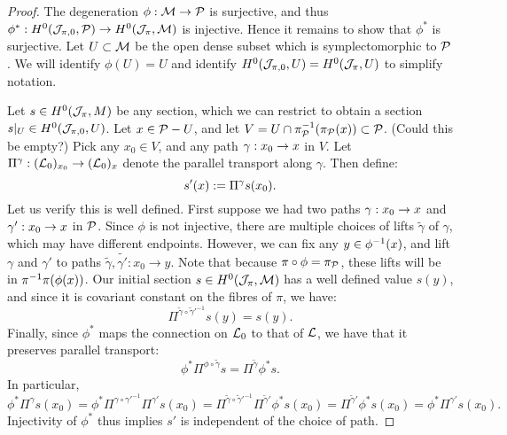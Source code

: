 	\begin{proof}
		The degeneration $\phi:\mathcal{M}\to\mathcal{P}$ is surjective, and thus $\phi^\ast:H^0(\mathcal{J}_{\pi,0},\mathcal{P}) \to H^0(\mathcal{J}_\pi,\mathcal{M})$ is injective. Hence it remains to show that $\phi^\ast$ is surjective. Let $U \subset \mathcal{M}$ be the open dense subset which is symplectomorphic to $\mathcal{P}$. We will identify $\phi(U)=U$ and identify $H^0(\mathcal{J}_{\pi,0}, U) = H^0(\mathcal{J}_\pi, U)$ to simplify notation.
		\smallskip
		
		Let $s\in H^0(\mathcal{J}_\pi, M)$ be any section, which we can restrict to obtain a section $s|_U\in H^0(\mathcal{J}_{\pi,0}, U)$. Let $x \in \mathcal{P} - U$, and let $V = U\cap \pi_{\mathcal{P}}^{-1}(\pi_{\mathcal{P}}(x)) \subset \mathcal{P}$. (Could this be empty?) Pick any $x_0\in V$, and any path $\gamma:x_0\to x$ in $V$. Let $\Pi^\gamma:(\mathcal{L}_0)_{x_0}\to(\mathcal{L}_0)_{x}$ denote the parallel transport along $\gamma$. Then define:
		\begin{equation}
			s'(x):= \Pi^\gamma s(x_0).
		\end{equation}
		Let us verify this is well defined. First suppose we had two paths $\gamma:x_0\to x$ and $\gamma':x_0\to x$ in $\mathcal{P}$. Since $\phi$ is not injective, there are multiple choices of lifts $\tilde{\gamma}$ of $\gamma$, which may have different endpoints. However, we can fix any $y \in \phi^{-1}(x)$, and lift $\gamma$ and $\gamma'$ to paths $\tilde{\gamma},\tilde{\gamma'}:x_0\to y$. Note that because $\pi \circ \phi = \pi_{\mathcal{P}}$, these lifts will be in $\pi^{-1}\pi(\phi(x))$. Our initial section $s\in H^0(\mathcal{J}_\pi, \mathcal{M})$ has a well defined value $s(y)$, and since it is covariant constant on the fibres of $\pi$, we have:
		\begin{equation}
		\Pi^{\tilde{\gamma}\circ \tilde{\gamma}'^{-1}} s(y) = s(y). 
		\end{equation}
		Finally, since $\phi^\ast$ maps the connection on $\mathcal{L}_0$ to that of $\mathcal{L}$, we have that it preserves parallel transport:
		\begin{equation}
		\phi^\ast \Pi^{\phi\circ\tilde{\gamma}} s = \Pi^{\tilde{\gamma}} \phi^\ast s.
		\end{equation}
		In particular, 
		\begin{equation}
		\phi^\ast \Pi^{\gamma}s(x_0) = \phi^\ast\Pi^{\gamma\circ\gamma'^{-1}}\Pi^{\gamma'}s(x_0) = \Pi^{\tilde{\gamma}\circ \tilde{\gamma}'^{-1}} \Pi^{\tilde{\gamma}'}\phi^\ast s(x_0) =  \Pi^{\tilde{\gamma}'}\phi^\ast s(x_0) = \phi^\ast\Pi^{\gamma'}s(x_0).
		\end{equation}
		Injectivity of $\phi^\ast$ thus implies $s'$ is independent of the choice of path. 
		\smallskip
		

\end{proof}
